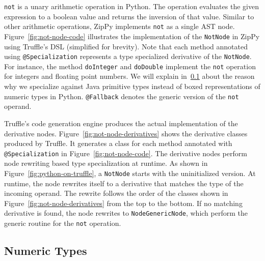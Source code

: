 \texttt{not} is a unary arithmetic operation in Python.
The operation evaluates the given expression to a boolean value and returns the inversion of that value.
Similar to other arithmetic operations, ZipPy implements \texttt{not} as a single AST node.
Figure~\ref{fig:not-node-code} illustrates the implementation of the \texttt{NotNode} in ZipPy using Truffle's DSL (simplified for brevity).
Note that each method annotated using \texttt{@Specialization} represents a type specialized derivative of the \texttt{NotNode}.
For instance, the method \texttt{doInteger} and \texttt{doDouble} implement the \texttt{not} operation for integers and floating point numbers.
We will explain in~\ref{sec:numeric-types} about the reason why we specialize against Java primitive types instead of boxed representations of numeric types in Python.
\texttt{@Fallback} denotes the generic version of the \texttt{not} operand.

Truffle's code generation engine produces the actual implementation of the derivative nodes.
Figure~\ref{fig:not-node-derivatives} shows the derivative classes produced by Truffle.
It generates a class for each method annotated with \texttt{@Specialization} in Figure~\ref{fig:not-node-code}.
The derivative nodes perform node rewriting based type specialization at runtime.
As shown in Figure~\ref{fig:python-on-truffle}, a \texttt{NotNode} starts with the uninitialized version.
At runtime, the node rewrites itself to a derivative that matches the type of the incoming operand.
The rewrite follows the order of the classes shown in Figure~\ref{fig:not-node-derivatives} from the top to the bottom.
If no matching derivative is found, the node rewrites to \texttt{NodeGenericNode}, which perform the generic routine for the \texttt{not} operation.

\subsection{Numeric Types}
\label{sec:numeric-types}


